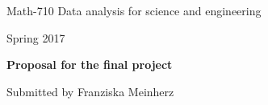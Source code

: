 \documentclass[11pt, UKenglish]{report}
\begin{document}

\noindent \large Math-710 Data analysis for science and engineering

\noindent Spring 2017

\vspace{0.5cm}
\noindent \LARGE \textbf{Proposal for the final project}

\normalsize
\vspace{1cm}
\noindent Submitted by \large{Franziska Meinherz}

\vspace{0.5cm}



\end{document}
